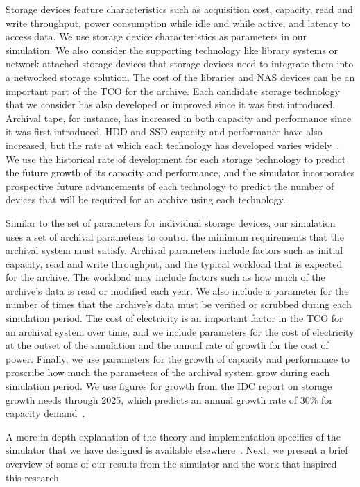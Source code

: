 Storage devices feature characteristics such as acquisition cost, capacity, read and write throughput, power consumption while idle and while active, and latency to access data.  We use storage device characteristics as parameters in our simulation.  We also consider the supporting technology like library systems or network attached storage devices that storage devices need to integrate them into a networked storage solution.  The cost of the libraries and NAS devices can be an important part of the TCO for the archive.  Each candidate storage technology that we consider has also developed or improved since it was first introduced.  Archival tape, for instance, has increased in both capacity and performance since it was first introduced.  HDD and SSD capacity and performance have also increased, but the rate at which each technology has developed varies widely~\cite{byronmaster}.  We use the historical rate of development for each storage technology to predict the future growth of its capacity and performance, and the simulator incorporates prospective future advancements of each technology to predict the number of devices that will be required for an archive using each technology.

Similar to the set of parameters for individual storage devices, our simulation uses a set of archival parameters to control the minimum requirements that the archival system must satisfy.  Archival parameters include factors such as initial capacity, read and write throughput, and the typical workload that is expected for the archive.  The workload may include factors such as how much of the archive's data is read or modified each year.  We also include a parameter for the number of times that the archive's data must be verified or scrubbed during each simulation period.  The cost of electricity is an important factor in the TCO for an archival system over time, and we include parameters for the cost of electricity at the outset of the simulation and the annual rate of growth for the cost of power.  Finally, we use parameters for the growth of capacity and performance to proscribe how much the parameters of the archival system grow during each simulation period.  We use figures for growth from the IDC report on storage growth needs through 2025, which predicts an annual growth rate of 30\% for capacity demand~\cite{idc1}.

A more in-depth explanation of the theory and implementation specifics of the simulator that we have designed is available elsewhere~\cite{byronmaster}.  Next, we present a brief overview of some of our results from the simulator and the work that inspired this research.

